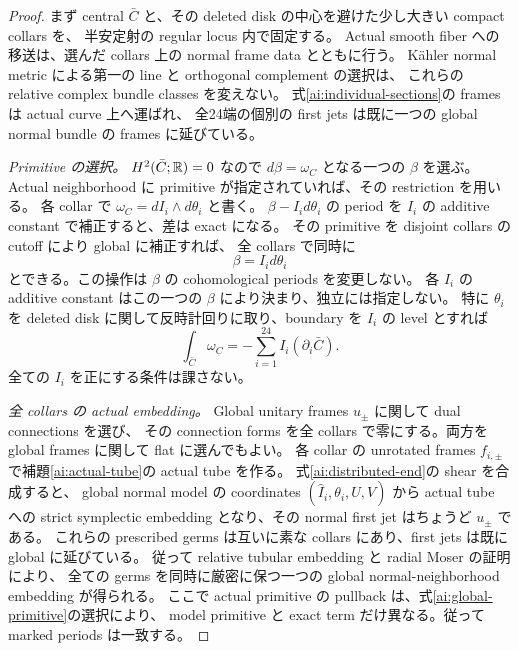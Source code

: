 \begin{proof}
まず central $\bar C$ と、その deleted disk の中心を避けた少し大きい compact collars を、
半安定射の regular locus 内で固定する。
Actual smooth fiber への移送は、選んだ collars 上の normal frame data とともに行う。
K\"ahler normal metric による第一の line と orthogonal complement の選択は、
これらの relative complex bundle classes を変えない。
式\eqref{ai:individual-sections}の frames は actual curve 上へ運ばれ、
全24端の個別の first jets は既に一つの global normal bundle の frames に延びている。

\emph{Primitive の選択。}
$H^2(\bar C;\mathbb R)=0$ なので $d\beta=\omega_C$ となる一つの $\beta$ を選ぶ。
Actual neighborhood に primitive が指定されていれば、その restriction を用いる。
各 collar で $\omega_C=dI_i\wedge d\theta_i$ と書く。
$\beta-I_i d\theta_i$ の period を $I_i$ の additive constant で補正すると、差は exact になる。
その primitive を disjoint collars の cutoff により global に補正すれば、
全 collars で同時に
\begin{equation}\label{ai:global-primitive}
 \beta=I_i d\theta_i
\end{equation}
とできる。この操作は $\beta$ の cohomological periods を変更しない。
各 $I_i$ の additive constant はこの一つの $\beta$ により決まり、独立には指定しない。
特に $\theta_i$ を deleted disk に関して反時計回りに取り、boundary を $I_i$ の level とすれば
\begin{equation}\label{ai:stokes}
 \int_{\bar C}\omega_C=-\sum_{i=1}^{24}I_i(\partial_i\bar C).
\end{equation}
全ての $I_i$ を正にする条件は課さない。

\emph{全 collars の actual embedding。}
Global unitary frames $u_\pm$ に関して dual connections を選び、
その connection forms を全 collars で零にする。両方を global frames に関して flat に選んでもよい。
各 collar の unrotated frames $f_{i,\pm}$ で補題\ref{ai:actual-tube}の actual tube を作る。
式\eqref{ai:distributed-end}の shear を合成すると、
global normal model の coordinates $(\widehat I_i,\theta_i,U,V)$ から actual tube への
strict symplectic embedding となり、その normal first jet はちょうど $u_\pm$ である。
これらの prescribed germs は互いに素な collars にあり、first jets は既に global に延びている。
従って relative tubular embedding と radial Moser の証明により、
全ての germs を同時に厳密に保つ一つの global normal-neighborhood embedding が得られる。
ここで actual primitive の pullback は、式\eqref{ai:global-primitive}の選択により、
model primitive と exact term だけ異なる。従って marked periods は一致する。


\end{proof}
